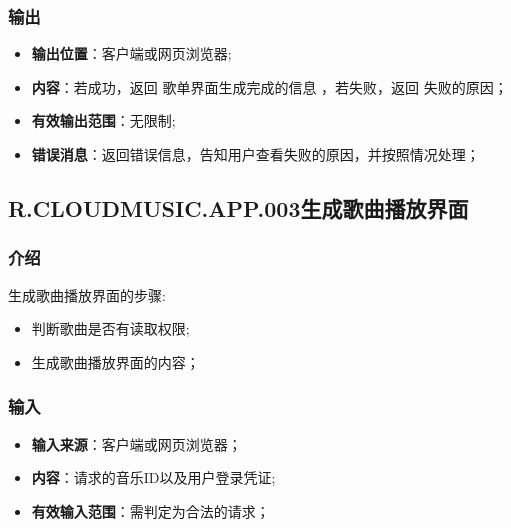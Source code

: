 \subsubsection{输出}
\begin{itemize}
	\item \textbf{输出位置}：客户端或网页浏览器;
	\item \textbf{内容}：若成功，返回 歌单界面生成完成的信息 ，若失败，返回 失败的原因；
	\item \textbf{有效输出范围}：无限制;
	\item \textbf{错误消息}：返回错误信息，告知用户查看失败的原因，并按照情况处理；
\end{itemize}

\subsection{R.CLOUDMUSIC.APP.003生成歌曲播放界面}
\subsubsection{介绍}
生成歌曲播放界面的步骤:
	\begin{itemize}
		\item 判断歌曲是否有读取权限;
		\item 生成歌曲播放界面的内容；
	\end{itemize}
\subsubsection{输入}
	\begin{itemize}
		\item \textbf{输入来源}：客户端或网页浏览器；
		\item \textbf{内容}：请求的音乐ID以及用户登录凭证;
		\item \textbf{有效输入范围}：需判定为合法的请求；
	\end{itemize}
